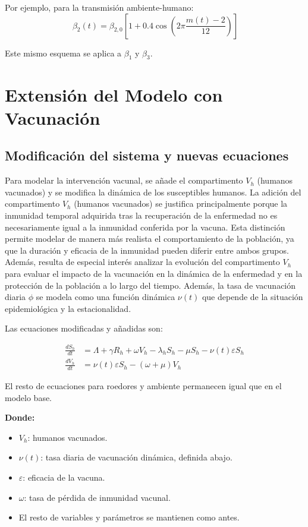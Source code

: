 \documentclass[12pt,a4paper]{article}
\begin{document}
Por ejemplo, para la transmisión ambiente-humano:
\[\
\beta_2(t) = \beta_{2,0} \left[1 + 0.4 \cos\left(2\pi \frac{m(t) - 2}{12}\right)\right]
\]

Este mismo esquema se aplica a $\beta_1$ y $\beta_3$.

\newpage

\section{Extensión del Modelo con Vacunación}

\subsection{Modificación del sistema y nuevas ecuaciones}

Para modelar la intervención vacunal, se añade el compartimento $V_h$ (humanos vacunados) y se modifica la dinámica de los susceptibles humanos. La adición del compartimento $V_h$ (humanos vacunados) se justifica principalmente porque la inmunidad temporal adquirida tras la recuperación de la enfermedad no es necesariamente igual a la inmunidad conferida por la vacuna. Esta distinción permite modelar de manera más realista el comportamiento de la población, ya que la duración y eficacia de la inmunidad pueden diferir entre ambos grupos. Además, resulta de especial interés analizar la evolución del compartimento $V_h$ para evaluar el impacto de la vacunación en la dinámica de la enfermedad y en la protección de la población a lo largo del tiempo. Además, la tasa de vacunación diaria $\phi$ se modela como una función dinámica $\nu(t)$ que depende de la situación epidemiológica y la estacionalidad.

Las ecuaciones modificadas y añadidas son:

\begin{align*}
\frac{dS_h}{dt} &= \Lambda + \gamma R_h + \omega V_h - \lambda_h S_h - \mu S_h - \nu(t) \varepsilon S_h \\
\frac{dV_h}{dt} &= \nu(t) \varepsilon S_h - (\omega + \mu) V_h
\end{align*}

El resto de ecuaciones para roedores y ambiente permanecen igual que en el modelo base.

\textbf{Donde:}
\begin{itemize}
    \item $V_h$: humanos vacunados.
    \item $\nu(t)$: tasa diaria de vacunación dinámica, definida abajo.
    \item $\varepsilon$: eficacia de la vacuna.
    \item $\omega$: tasa de pérdida de inmunidad vacunal.
    \item El resto de variables y parámetros se mantienen como antes.
\end{itemize}
\end{document}
